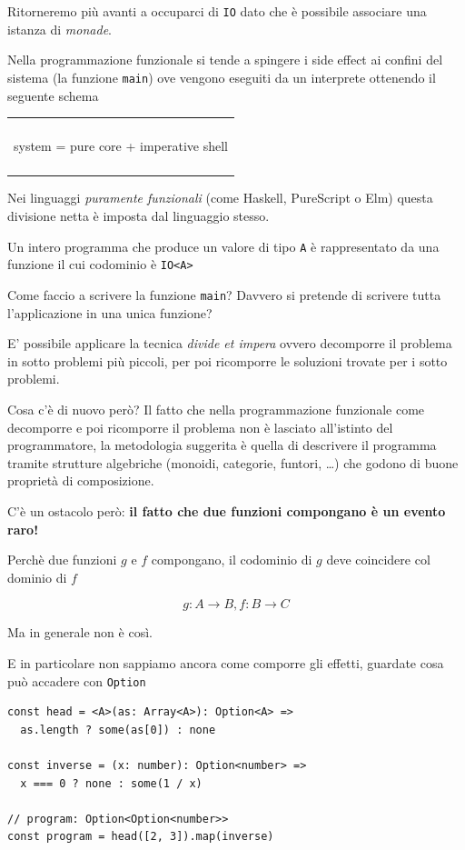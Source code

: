 \documentclass[12pt]{article}
\newenvironment{boxed}
    {\begin{center}
    \begin{tabular}{|p{0.9\textwidth}|}
    \hline\\
    }
    {
    \\\\\hline
    \end{tabular}
    \end{center}
    }
\begin{document}
Ritorneremo più avanti a occuparci di \texttt{IO} dato che è possibile associare una istanza di \emph{monade}.

Nella programmazione funzionale si tende a spingere i side effect ai confini del sistema (la funzione \texttt{main})
ove vengono eseguiti da un interprete ottenendo il seguente schema

\begin{boxed}
\begin{center}
system = pure core + imperative shell
\end{center}
\end{boxed}

Nei linguaggi \emph{puramente funzionali} (come Haskell, PureScript o Elm) questa divisione netta è imposta dal linguaggio stesso.

Un intero programma che produce un valore di tipo \texttt{A} è rappresentato da una funzione il cui codominio è \texttt{IO<A>}

Come faccio a scrivere la funzione \texttt{main}? Davvero si pretende di scrivere tutta l'applicazione in una unica funzione?

E' possibile applicare la tecnica \emph{divide et impera} ovvero decomporre il problema in sotto problemi più piccoli,
per poi ricomporre le soluzioni trovate per i sotto problemi.

Cosa c'è di nuovo però? Il fatto che nella programmazione funzionale come decomporre e poi ricomporre il problema non è lasciato
all'istinto del programmatore, la metodologia suggerita è quella di descrivere il programma tramite strutture algebriche
(monoidi, categorie, funtori, \ldots) che godono di buone proprietà di composizione.

C'è un ostacolo però: \textbf{il fatto che due funzioni compongano è un evento raro!}

Perchè due funzioni $g$ e $f$ compongano, il codominio di $g$ deve coincidere col dominio di $f$

$$
g: A \rightarrow B, f: B \rightarrow C
$$

Ma in generale non è così.

E in particolare non sappiamo ancora come comporre gli effetti, guardate cosa può accadere con \texttt{Option}

\begin{verbatim}
const head = <A>(as: Array<A>): Option<A> =>
  as.length ? some(as[0]) : none

const inverse = (x: number): Option<number> =>
  x === 0 ? none : some(1 / x)

// program: Option<Option<number>>
const program = head([2, 3]).map(inverse)
\end{verbatim}
\end{document}
